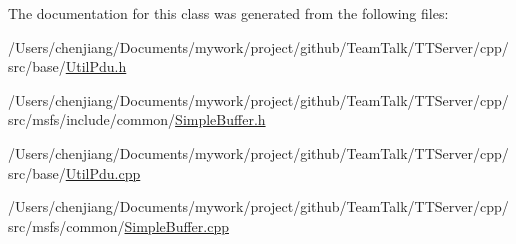 The documentation for this class was generated from the following files\+:\begin{DoxyCompactItemize}
\item 
/\+Users/chenjiang/\+Documents/mywork/project/github/\+Team\+Talk/\+T\+T\+Server/cpp/src/base/\hyperlink{_util_pdu_8h}{Util\+Pdu.\+h}\item 
/\+Users/chenjiang/\+Documents/mywork/project/github/\+Team\+Talk/\+T\+T\+Server/cpp/src/msfs/include/common/\hyperlink{_simple_buffer_8h}{Simple\+Buffer.\+h}\item 
/\+Users/chenjiang/\+Documents/mywork/project/github/\+Team\+Talk/\+T\+T\+Server/cpp/src/base/\hyperlink{_util_pdu_8cpp}{Util\+Pdu.\+cpp}\item 
/\+Users/chenjiang/\+Documents/mywork/project/github/\+Team\+Talk/\+T\+T\+Server/cpp/src/msfs/common/\hyperlink{_simple_buffer_8cpp}{Simple\+Buffer.\+cpp}\end{DoxyCompactItemize}
